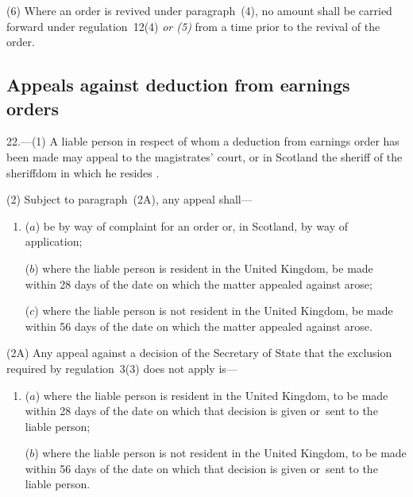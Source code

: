 \documentclass[12pt,a4paper]{article}
\begin{document}
(6) Where an order is revived under paragraph~(4), no amount shall be carried forward under regulation~12(4)  
\emph{or (5)}   %
from a time prior to the revival of the order.


\subsection[22. Appeals against deduction from earnings orders]{Appeals against deduction from earnings orders}

22.—(1) A liable person in respect of whom a deduction from earnings order has been made may appeal to the magistrates' court, or in Scotland the sheriff
of the sheriffdom in which he resides%
.

(2) 
Subject to paragraph~(2A),  %
any appeal shall—
\begin{enumerate}\item[]
($a$) be by way of complaint for an order or, in Scotland, by way of application;

($b$) 
where the liable person is resident in the United Kingdom,  %
be made within 28 days of the date on which the matter appealed against arose;

($c$) where the liable person is not resident in the United Kingdom, be made within 56 days of the date on which the matter appealed against arose.
\end{enumerate}

(2A) Any appeal against a decision of the Secretary of State that the exclusion required by regulation~3(3) does not apply is—
\begin{enumerate}\item[]
($a$) where the liable person is resident in the United Kingdom, to be made within 28 days of the date on which that decision is given or~sent to the liable person;

($b$) where the liable person is not resident in the United Kingdom, to be made within 56 days of the date on which that decision is given or~sent to the liable person.
\end{enumerate}
\end{document}

